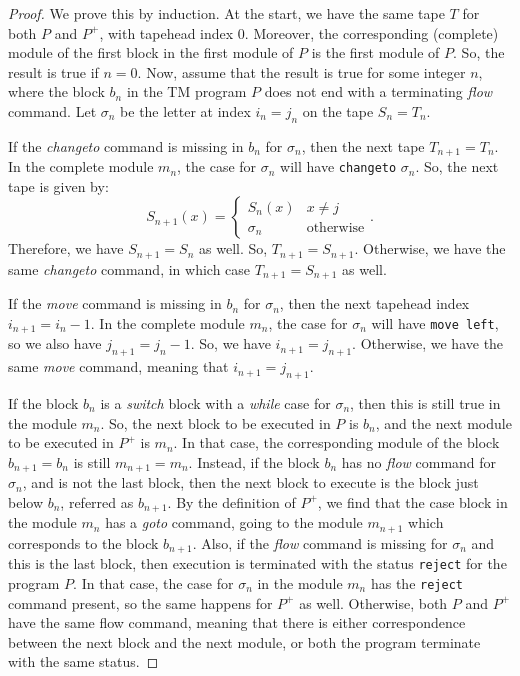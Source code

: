 \documentclass{amsart}
\theoremstyle{definition}
\begin{document}
    \begin{proof}
        We prove this by induction. At the start, we have the same tape $T$ for both $P$ and $P^+$, with tapehead index 0. Moreover, the corresponding (complete) module of the first block in the first module of $P$ is the first module of $P$. So, the result is true if $n = 0$. Now, assume that the result is true for some integer $n$, where the block $b_n$ in the TM program $P$ does not end with a terminating \textit{flow} command. Let $\sigma_n$ be the letter at index $i_n = j_n$ on the tape $S_n = T_n$.
        
        If the \textit{changeto} command is missing in $b_n$ for $\sigma_n$, then the next tape $T_{n+1} = T_n$. In the complete module $m_n$, the case for $\sigma_n$ will have \texttt{changeto} $\sigma_n$. So, the next tape is given by:
        \[S_{n+1}(x) = \begin{cases}
            S_n(x) & x \neq j \\
            \sigma_n & \text{otherwise}
        \end{cases}.\]
        Therefore, we have $S_{n+1} = S_n$ as well. So, $T_{n+1} = S_{n+1}$. Otherwise, we have the same \textit{changeto} command, in which case $T_{n+1} = S_{n+1}$ as well.

        If the \textit{move} command is missing in $b_n$ for $\sigma_n$, then the next tapehead index $i_{n+1} = i_n - 1$. In the complete module $m_n$, the case for $\sigma_n$ will have \texttt{move left}, so we also have $j_{n+1} = j_n - 1$. So, we have $i_{n+1} = j_{n+1}$. Otherwise, we have the same \textit{move} command, meaning that $i_{n+1} = j_{n+1}$.

        If the block $b_n$ is a \textit{switch} block with a \textit{while} case for $\sigma_n$, then this is still true in the module $m_n$. So, the next block to be executed in $P$ is $b_n$, and the next module to be executed in $P^+$ is $m_n$. In that case, the corresponding module of the block $b_{n+1} = b_n$ is still $m_{n+1} = m_n$. Instead, if the block $b_n$ has no \textit{flow} command for $\sigma_n$, and is not the last block, then the next block to execute is the block just below $b_n$, referred as $b_{n+1}$. By the definition of $P^+$, we find that the case block in the module $m_n$ has a \textit{goto} command, going to the module $m_{n+1}$ which corresponds to the block $b_{n+1}$. Also, if the \textit{flow} command is missing for $\sigma_n$ and this is the last block, then execution is terminated with the status \texttt{reject} for the program $P$. In that case, the case for $\sigma_n$ in the module $m_n$ has the \texttt{reject} command present, so the same happens for $P^+$ as well. Otherwise, both $P$ and $P^+$ have the same flow command, meaning that there is either correspondence between the next block and the next module, or both the program terminate with the same status.
    \end{proof}
\end{document}
